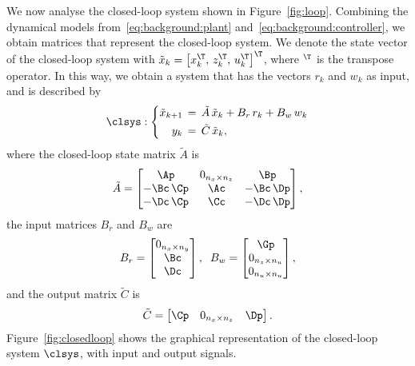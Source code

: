 We now analyse the closed-loop system shown in Figure~\ref{fig:loop}.
Combining the dynamical models from~\eqref{eq:background:plant} and~\eqref{eq:background:controller}, we obtain matrices that represent the closed-loop system.
We denote the state vector of the closed-loop system with $\tilde{x}_k = \left[ x_k^\T,\, z_k^\T,\, u_k^\T \right]^\T$, where $^\T$ is the transpose operator.
In this way, we obtain a system that has the vectors $r_k$ and $w_k$ as input, and is described by
%
\begin{equation} 
\label{eq:feedback-basic}
    \clsys : \left\{
    \begin{aligned}
        \tilde{x}_{k+1} &\,=\, \tilde A\,\tilde{x}_{k} + B_r\,r_{k} + B_w\,w_{k}\\
        y_{k} &\,=\, \tilde C\,\tilde{x}_{k},
    \end{aligned} \right.
\end{equation}
%
where the closed-loop state matrix $\tilde A$ is
%
\begin{equation}
\label{eq:matrixA}
    \tilde A =
    \begin{bmatrix} \Ap       & 0_{n_x \times n_z} & \Bp \\
                    -\Bc\,\Cp & \Ac                                      & -\Bc\,\Dp \\
                    -\Dc\,\Cp & \Cc                                      & -\Dc\,\Dp
    \end{bmatrix},
\end{equation}
%
the input matrices $B_r$ and $B_w$ are
%
\begin{equation}
    B_r = \begin{bmatrix} 0_{n_x \times n_y} \\ \Bc \\ \Dc \end{bmatrix},\;\;
    B_w = \begin{bmatrix} \Gp \\ 0_{n_z \times n_u} \\ 0_{n_u \times n_u} \end{bmatrix},
\end{equation}
%
and the output matrix $\tilde C$ is
%
\begin{equation}
    \tilde C = \begin{bmatrix} \Cp & 0_{n_x \times n_z} & \Dp \end{bmatrix}.
\end{equation}
%
Figure~\ref{fig:closedloop} shows the graphical representation of the closed-loop system $\clsys$, with input and output signals.

